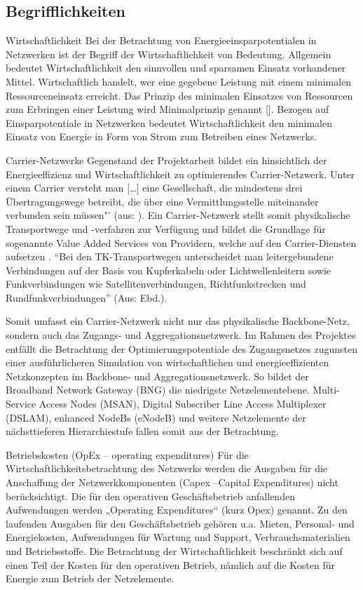 \documentclass[12pt,titlepage]{article}
\begin{document}
\subsection{Begrifflichkeiten}
Wirtschaftlichkeit
Bei der Betrachtung von Energieeinsparpotentialen in Netzwerken ist der Begriff der Wirtschaftlichkeit von Bedeutung. Allgemein bedeutet Wirtschaftlichkeit den sinnvollen und sparsamen Einsatz vorhandener Mittel. Wirtschaftlich handelt, wer eine gegebene Leistung mit einem minimalen Ressourceneinsatz erreicht. Das Prinzip des minimalen Einsatzes von Ressourcen zum Erbringen einer Leistung wird Minimalprinzip genannt []. Bezogen auf Einsparpotentiale in Netzwerken bedeutet Wirtschaftlichkeit den minimalen Einsatz von Energie in Form von Strom zum Betreiben eines Netzwerks.


Carrier-Netzwerke
Gegenstand der Projektarbeit bildet ein hinsichtlich der Energieeffizienz und Wirtschaftlichkeit zu optimierendes Carrier-Netzwerk.
Unter einem Carrier versteht man […] eine Gesellschaft, die mindestens drei Übertra\-gungs\-wege betreibt, die über eine Vermittlungsstelle miteinander verbunden sein müssen"' (aus: \cite{carrier}). Ein Carrier-Netzwerk stellt somit physikalische Transportwege und -verfahren zur Verfügung und bildet die Grundlage für sogenannte Value Added Services von Providern, welche auf den Carrier-Diensten aufsetzen \cite{fassnacht}. "`Bei den TK-Transportwegen unterscheidet man leitergebundene Verbindungen auf der Basis von Kupferkabeln oder Lichtwellenleitern sowie Funkverbindungen wie Satellitenverbindungen, Richtfunkstrecken und Rundfunkverbindungen"' (Aus: Ebd.).%

Somit umfasst ein Carrier-Netzwerk nicht nur das physikalische Backbone-Netz, sondern auch das Zugangs- und Aggregationsnetzwerk. Im Rahmen des Projektes entfällt die Betrachtung der Optimierungspotentiale des Zugangsnetzes zugunsten einer aus\-führ\-lich\-eren Simulation von wirtschaftlichen und energieeffizienten Netzkonzepten im Backbone- und Aggregationsnetzwerk. So bildet der Broadband Network Gateway (BNG) die niedrigste Netzelementebene. Multi-Service Access Nodes (MSAN), Digital Subscriber Line Access Multiplexer (DSLAM), enhanced NodeBs (eNodeB) und weitere Netzelemente der nächsttieferen Hierarchiestufe fallen somit aus der Betrachtung.


Betriebskosten (OpEx – operating expenditures) 
Für die Wirtschaftlichkeitsbetrachtung des Netzwerks werden die Ausgaben für die Anschaffung der Netzwerkkomponenten (Capex –Capital Expenditures) nicht berücksichtigt. Die für den operativen Geschäftsbetrieb anfallenden Aufwendungen werden „Operating Expenditures“ (kurz Opex) genannt. Zu den laufenden Ausgaben für den Geschäftsbetrieb gehören u.a. Mieten, Personal- und Energiekosten, Aufwendungen für Wartung und Support, Verbrauchsmaterialien und Betriebsstoffe. 
Die Betrachtung der Wirtschaftlichkeit beschränkt sich auf einen Teil der Kosten für den operativen Betrieb, nämlich auf die Kosten für Energie zum Betrieb der Netzelemente.
\end{document}
